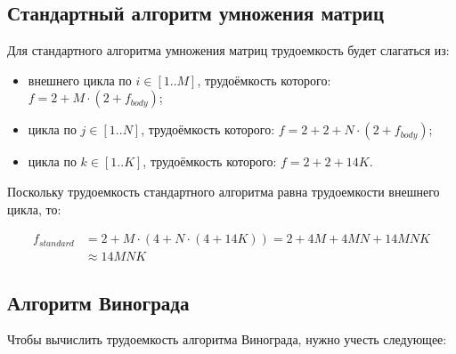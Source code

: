 \subsection{Стандартный алгоритм умножения матриц}

Для стандартного алгоритма умножения матриц трудоемкость будет слагаться из:
\begin{itemize}[label=---]
	\item внешнего цикла по $i \in [1..M]$, трудоёмкость которого: $f = 2 + M \cdot (2 + f_{body})$;
	\item цикла по $j \in [1..N]$, трудоёмкость которого: $f = 2 + 2 + N \cdot (2 + f_{body})$;
	\item цикла по $k \in [1..K]$, трудоёмкость которого: $f = 2 + 2 + 14K$. \newline
\end{itemize}

Поскольку трудоемкость стандартного алгоритма равна трудоемкости внешнего цикла, то:

\begin{equation}
	\begin{split}
	\label{for:standard}
	f_{standard} &= 2 + M \cdot (4 + N \cdot (4 + 14K)) = 2 + 4M + 4MN + 14MNK\\ &\approx 14MNK
	\end{split}
\end{equation}


\subsection{Алгоритм Винограда}

Чтобы вычислить трудоемкость алгоритма Винограда, нужно учесть следующее:

